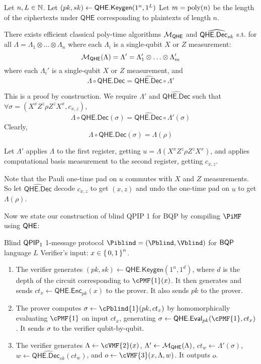 \begin{thm}
	\label{decodeMeasureOrder}
	Let $n, L\in\mathbb{N}$.
	Let $(pk, sk)\leftarrow\mathsf{QHE.Keygen}(1^n, 1^L)$
	Let $m=\operatorname*{\operatorname{poly}}(n)$ be the length of the ciphertexts under $\mathsf{QHE}$ corresponding to plaintexts of length $n$.
	
	There exists efficient classical poly-time algorithms ${\cal M}_{\mathsf{QHE}}$ and $\widehat{\mathsf{QHE.Dec}_{sk}}$ s.t.
	for all $\Lambda=\Lambda_1\otimes\ldots\otimes\Lambda_n$ where each $\Lambda_i$ is a single-qubit $X$ or $Z$ measurement:
	$${\cal M}_{\mathsf{QHE}}(\Lambda)=\Lambda'=\Lambda'_1\otimes\ldots\otimes\Lambda'_m$$
	where each $\Lambda_i'$ is a single-qubit $X$ or $Z$ measurement, and
	$$\Lambda\circ\mathsf{QHE.Dec}=\widehat{\mathsf{QHE.Dec}}\circ\Lambda'$$
\end{thm}
\begin{prf}
	This is a proof by construction.
	We require $\Lambda'$ and $\widehat{\mathsf{QHE.Dec}}$ such that $\forall\sigma=(X^xZ^z\rho Z^zX^x, c_{x,z})$,
	$$\Lambda\circ\mathsf{QHE.Dec}(\sigma)=\widehat{\mathsf{QHE.Dec}}\circ\Lambda'(\sigma)$$
	Clearly,
	$$\Lambda\circ\mathsf{QHE.Dec}(\sigma)=\Lambda(\rho)$$
	
	Let $\Lambda'$ applies $\Lambda$ to the first register, getting $u=\Lambda(X^xZ^z\rho Z^zX^x)$, and applies computational basis measurement to the second register, getting $c_{x, z}$.

	Note that the Pauli one-time pad on $u$ commutes with $X$ and $Z$ measurements.
	So let $\widehat{\mathsf{QHE.Dec}}$ decode $c_{x, z}$ to get $(x, z)$ and undo the one-time pad on $u$ to get $\Lambda(\rho)$.
\end{prf}

Now we state our construction of blind QPIP 1 for BQP by compiling $\PiMF$ using $\mathsf{QHE}$:


\begin{protocol}{Blind $\operatorname{\mathsf{QPIP}}_1$ 1-message protocol $\Piblind = (\Pblind, \Vblind)$ for $\operatorname{\mathsf{BQP}}$ language $L$}
	\label{proto:BlindBQP}
	Verifier's input: $x\in\set{0,1}^n$.
	
	\begin{enumerate}
		\item The verifier generates $(pk, sk)\leftarrow\mathsf{QHE.Keygen}(1^n, 1^d)$, where $d$ is the depth of the circuit corresponding to $\cPMF{1}(x)$.
			It then generates and sends $ct_x\leftarrow\mathsf{QHE.Enc}_{pk}(x)$ to the prover.
			It also sends $pk$ to the prover.
		\item The prover computes $\sigma\leftarrow\cPblind{1}(pk, ct_x)$ by homomorphically evaluating $\cPMF{1}$ on input $ct_x$, generating $\sigma\leftarrow\QEval_{pk}(\cPMF{1}, ct_x)$.
			It sends $\sigma$ to the verifier qubit-by-qubit.
		\item The verifier generates $\Lambda\leftarrow\cVMF{2}(x)$,
			$\Lambda'\leftarrow{\cal M}_{\mathsf{QHE}}(\Lambda)$,
			$ct_w\leftarrow\Lambda'(\sigma)$,
			$w\leftarrow\widehat{\mathsf{QHE.Dec}_{sk}}(ct_w)$,
			and $o\leftarrow\cVMF{3}(x, \Lambda, w)$.
			It outputs $o$.
	\end{enumerate}
\end{protocol}


